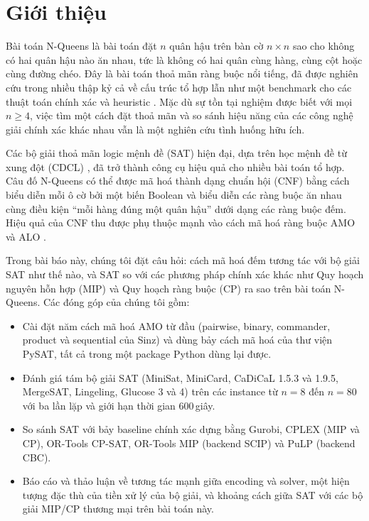 \documentclass[a4paper,fleqn]{cas-sc}
\begin{document}
\section{Giới thiệu}\label{sec:intro}
Bài toán N-Queens là bài toán đặt $n$ quân hậu trên bàn cờ $n\times n$ sao cho
không có hai quân hậu nào ăn nhau, tức là không có hai quân cùng hàng, cùng cột
hoặc cùng đường chéo. Đây là bài toán thoả mãn ràng buộc nổi tiếng, đã được
nghiên cứu trong nhiều thập kỷ cả về cấu trúc tổ hợp lẫn như một benchmark cho
các thuật toán chính xác và heuristic \citep{BellStevens2009}. Mặc dù sự tồn tại
nghiệm được biết với mọi $n \geq 4$, việc tìm một cách đặt thoả mãn và so sánh
hiệu năng của các công nghệ giải chính xác khác nhau vẫn là một nghiên cứu tình
huống hữu ích.

Các bộ giải thoả mãn logic mệnh đề (SAT) hiện đại, dựa trên học mệnh đề từ xung
đột (CDCL) \citep{MarquesSilva1999}, đã trở thành công cụ hiệu quả cho nhiều bài
toán tổ hợp. Câu đố N-Queens có thể được mã hoá thành dạng chuẩn hội (CNF) bằng
cách biểu diễn mỗi ô cờ bởi một biến Boolean và biểu diễn các ràng buộc ăn nhau
cùng điều kiện ``mỗi hàng đúng một quân hậu'' dưới dạng các ràng buộc đếm. Hiệu
quả của CNF thu được phụ thuộc mạnh vào cách mã hoá ràng buộc AMO và ALO
\citep{Sinz2005,Prestwich2009,KlieberKwon2007}.

Trong bài báo này, chúng tôi đặt câu hỏi: cách mã hoá đếm tương tác với bộ giải
SAT như thế nào, và SAT so với các phương pháp chính xác khác như Quy hoạch
nguyên hỗn hợp (MIP) và Quy hoạch ràng buộc (CP) ra sao trên bài toán N-Queens.
Các đóng góp của chúng tôi gồm:
\begin{itemize}
  \item Cài đặt năm cách mã hoá AMO từ đầu (pairwise, binary, commander, product
        và sequential của Sinz) và dùng bảy cách mã hoá của thư viện PySAT, tất cả
        trong một package Python dùng lại được.
  \item Đánh giá tám bộ giải SAT (MiniSat, MiniCard, CaDiCaL 1.5.3 và 1.9.5,
        MergeSAT, Lingeling, Glucose 3 và 4) trên các instance từ $n=8$ đến
        $n=80$ với ba lần lặp và giới hạn thời gian 600\,giây.
  \item So sánh SAT với bảy baseline chính xác dựng bằng Gurobi, CPLEX (MIP và
        CP), OR-Tools CP-SAT, OR-Tools MIP (backend SCIP) và PuLP (backend CBC).
  \item Báo cáo và thảo luận về tương tác mạnh giữa encoding và solver, một hiện
        tượng đặc thù của tiền xử lý của bộ giải, và khoảng cách giữa SAT với các
        bộ giải MIP/CP thương mại trên bài toán này.
\end{itemize}
\end{document}
